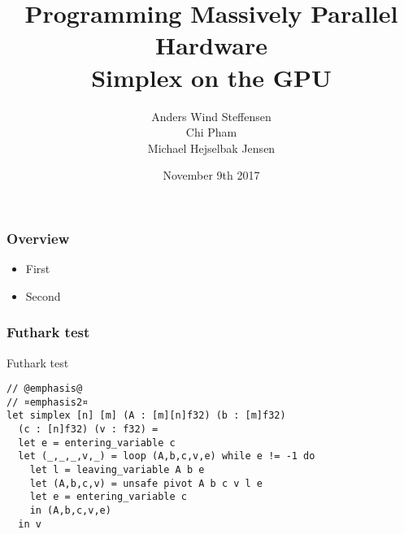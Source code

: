 \documentclass[handout]{beamer}
\title{Programming Massively Parallel Hardware\\\textbf{Simplex on the GPU}}
\author[]{%
  Anders Wind Steffensen \\
  Chi Pham \\
  Michael Hejselbak Jensen \\
}
\institute{Department of Computer Science (DIKU)\\University of Copenhagen}
\date[3/3]{November 9th 2017}
\begin{document}
\titleslide


\begin{frame}
  \frametitle{Overview}

  \begin{itemize}
  \item First
  \item Second
  \end{itemize}
\end{frame}

\begin{frame}[fragile]
\frametitle{Futhark test}
Futhark test
\pause
\begin{lstlisting}
// @emphasis@
// ¤emphasis2¤
let simplex [n] [m] (A : [m][n]f32) (b : [m]f32)
  (c : [n]f32) (v : f32) =
  let e = entering_variable c
  let (_,_,_,v,_) = loop (A,b,c,v,e) while e != -1 do
    let l = leaving_variable A b e
    let (A,b,c,v) = unsafe pivot A b c v l e
    let e = entering_variable c
    in (A,b,c,v,e)
  in v

\end{lstlisting}
\end{frame}
\end{document}
